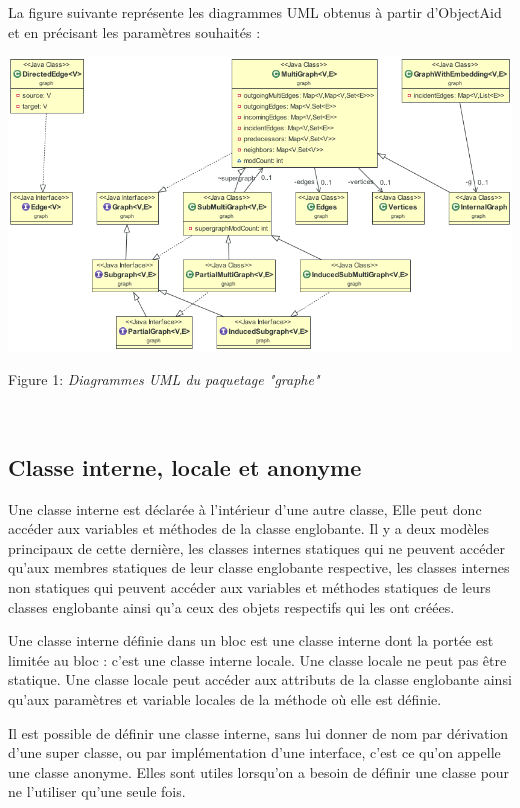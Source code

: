 \documentclass[12pt]{report}
\begin{document}
La figure suivante représente les diagrammes UML obtenus à partir d'ObjectAid et en précisant les paramètres souhaités :


\begin{center}
\includegraphics[width=1.05\textwidth]{DiagUML.png}
\caption{\label{fig:DiagUMLPartie1}}
\newline Figure 1: \textit{Diagrammes UML du paquetage "graphe" }
\end{center}

\newpage
~\\
\subsection{Classe interne, locale et anonyme}

Une classe interne est déclarée à l'intérieur d'une autre classe, Elle peut donc accéder aux variables et méthodes de la classe englobante. Il y a deux modèles principaux de cette dernière, les classes internes statiques qui ne peuvent accéder qu'aux membres statiques de leur classe englobante respective, les classes internes non statiques qui peuvent accéder aux variables et méthodes statiques de leurs classes englobante ainsi qu'a ceux des objets respectifs qui les ont créées.\newline

Une classe interne définie dans un bloc est une classe interne dont la portée est limitée au bloc : c’est une classe interne locale. Une classe locale ne peut pas être statique. Une classe locale peut accéder aux attributs de la classe englobante ainsi qu'aux paramètres et variable locales de la méthode où elle est définie.\newline 

Il est possible de définir une classe interne, sans lui donner de nom par dérivation d'une super classe, ou par implémentation d’une interface, c'est ce qu'on appelle une classe anonyme. Elles sont utiles lorsqu'on a besoin de définir une classe pour ne l'utiliser qu'une seule fois.\newline
\end{document}

